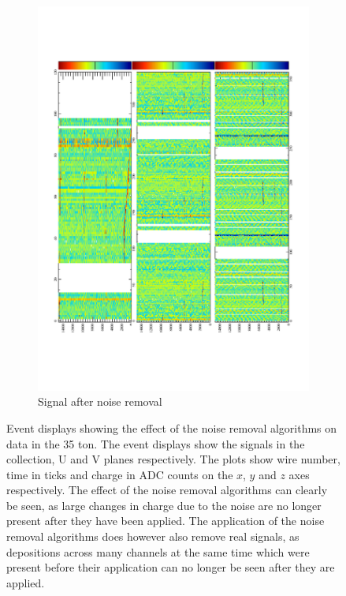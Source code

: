 \begin{figure}[h!]
\begin{subfigure}{0.55\textwidth}
    \includegraphics[width=\textwidth]{Evd_AfterNoise}
    \caption{Signal after noise removal}
  \end{subfigure}
  \caption[The effect of noise removal algorithms in the 35 ton]
          {Event displays showing the effect of the noise removal algorithms on data in the 35 ton. The event displays show the signals in the collection, U and V planes respectively. The plots show wire number, time in ticks and charge in ADC counts on the $x$, $y$ and $z$ axes respectively. The effect of the noise removal algorithms can clearly be seen, as large changes in charge due to the noise are no longer present after they have been applied. The application of the noise removal algorithms does however also remove real signals, as depositions across many channels at the same time which were present before their application can no longer be seen after they are applied.}
  \label{fig:NoiseRemoval}
\end{figure}

